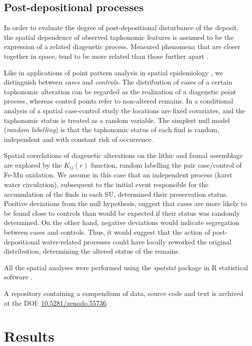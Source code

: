\documentclass[5p,authoryear]{elsarticle} %
\begin{document}
\subsection{Post-depositional processes}

In order to evaluate the degree of post-depositional disturbance of the deposit, the spatial dependence of observed taphonomic features is assumed to be the expression of a related diagenetic process. Measured phenomena that are closer together in space, tend to be more related than those further apart \citep{Tobler1970}.

Like in applications of point pattern analysis in spatial epidemiology \citep{Diggle2003,Gatrell1996}, we distinguish between \emph{cases} and \emph{controls}. The distribution of cases of a certain taphonomic alteration can be regarded as the realization of a diagenetic point process, whereas control points refer to non-altered remains. In a conditional analysis of a spatial case-control study the locations are fixed covariates, and the taphonomic status is treated as a random variable. The simplest null model (\emph{random labelling}) is that the taphonomic status of each find is random, independent and with constant risk of occurrence.

Spatial correlations of diagenetic alterations on the lithic and faunal assemblage are explored by the $K_{ij}(r)$ function, random labelling the pair case/control of Fe-Mn oxidation. We assume in this case that an independent process (karst water circulation), subsequent to the initial event responsible for the accumulation of the finds in each SU, determined their preservation status. Positive deviations from the null hypothesis, suggest that cases are more likely to be found close to controls than would be expected if their status was randomly determined. On the other hand, negative deviations would indicate segregation between cases and controls. Thus, it would suggest that the action of post-depositional water-related processes could have locally reworked the original distribution, determining the altered status of the remains.

All the spatial analyses were performed using the \emph{spatstat} package \citep{Baddeley2015} in \textsf{R} statistical software \citep{RCoreTeam2015}.

A repository containing a compendium of data, source code and text \citep{Marwick2016} is archived at the DOI: \href{http://dx.doi.org/10.5281/zenodo.55736}{10.5281/zenodo.55736}.

\section{Results}
\end{document}
